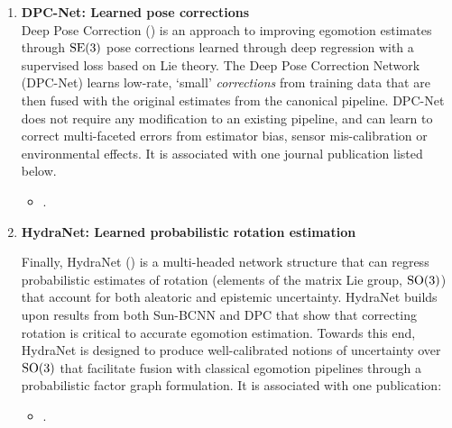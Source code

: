 \begin{enumerate}
\item \textbf{DPC-Net: Learned pose corrections} \\
Deep Pose Correction () is an approach to improving egomotion estimates through $\mathrm{SE}(3)$ pose corrections learned through deep regression with a supervised loss based on Lie theory. The Deep Pose Correction Network (DPC-Net) learns low-rate, `small' \textit{corrections} from training data that are then fused with the original estimates from the canonical pipeline. DPC-Net does not require any modification to an existing pipeline, and can learn to correct multi-faceted errors from estimator bias, sensor mis-calibration or environmental effects. It is associated with one journal publication listed below.
\begin{itemize}
\item {}.
\end{itemize}

\item \textbf{HydraNet: Learned probabilistic rotation estimation}

Finally, HydraNet () is a multi-headed network structure that can regress probabilistic estimates of rotation (elements of the matrix Lie group, $\mathrm{SO}(3)$) that account for both aleatoric and epistemic uncertainty. HydraNet builds upon results from both Sun-BCNN and DPC that show that correcting rotation is critical to accurate egomotion estimation.  Towards this end, HydraNet is designed to produce well-calibrated notions of uncertainty over $\mathrm{SO}(3)$  that facilitate fusion with classical egomotion pipelines through a probabilistic factor graph formulation. It is associated with one publication:

\begin{itemize}
\item {}.
\end{itemize}


\end{enumerate}

%






